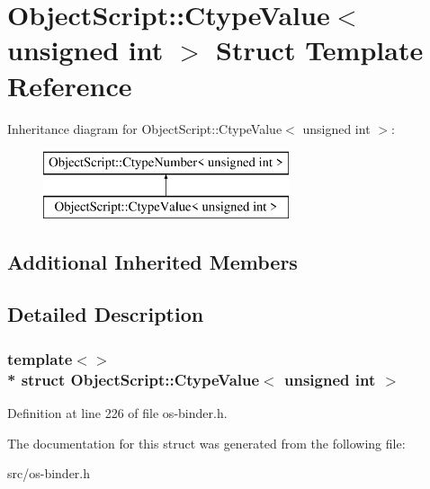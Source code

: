 \hypertarget{struct_object_script_1_1_ctype_value_3_01unsigned_01int_01_4}{}\section{Object\+Script\+:\+:Ctype\+Value$<$ unsigned int $>$ Struct Template Reference}
\label{struct_object_script_1_1_ctype_value_3_01unsigned_01int_01_4}
Inheritance diagram for Object\+Script\+:\+:Ctype\+Value$<$ unsigned int $>$\+:\begin{figure}[H]
\begin{center}
\leavevmode
\includegraphics[height=2.000000cm]{struct_object_script_1_1_ctype_value_3_01unsigned_01int_01_4}
\end{center}
\end{figure}
\subsection*{Additional Inherited Members}


\subsection{Detailed Description}
\subsubsection*{template$<$$>$\\*
struct Object\+Script\+::\+Ctype\+Value$<$ unsigned int $>$}



Definition at line 226 of file os-\/binder.\+h.



The documentation for this struct was generated from the following file\+:\begin{DoxyCompactItemize}
\item 
src/os-\/binder.\+h\end{DoxyCompactItemize}
